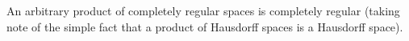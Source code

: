 An arbitrary product of completely regular spaces is completely regular (taking note of the simple fact that a product of Hausdorff spaces is a Hausdorff space).
